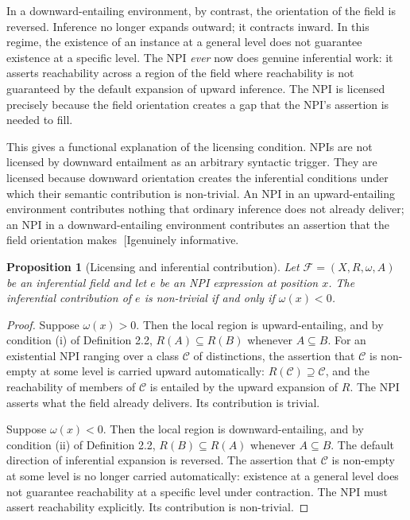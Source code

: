 \documentclass[12pt]{article}
\newtheorem{proposition}[theorem]{Proposition}
\theoremstyle{remark}
\begin{document}
In a downward-entailing environment, by contrast, the orientation of
the field is reversed. Inference no longer expands outward; it contracts
inward. In this regime, the existence of an instance at a general level
does not guarantee existence at a specific level. The NPI \emph{ever}
now does genuine inferential work: it asserts reachability across a
region of the field where reachability is not guaranteed by the default
expansion of upward inference. The NPI is licensed precisely because the
field orientation creates a gap that the NPI's assertion is needed to
fill.

This gives a functional explanation of the licensing condition. NPIs are
not licensed by downward entailment as an arbitrary syntactic trigger.
They are licensed because downward orientation creates the inferential
conditions under which their semantic contribution is non-trivial. An
NPI in an upward-entailing environment contributes nothing that ordinary
inference does not already deliver; an NPI in a downward-entailing
environment contributes an assertion that the field orientation makes
[Igenuinely informative.

\begin{proposition}[Licensing and inferential contribution]
\label{prop:npi-contrib}
Let $\mathcal{F} = (X, R, \omega, A)$ be an inferential field and let
$e$ be an NPI expression at position $x$. The inferential contribution
of $e$ is non-trivial if and only if $\omega(x) < 0$.
\end{proposition}

\begin{proof}
Suppose $\omega(x) > 0$. Then the local region is upward-entailing, and
by condition (i) of Definition 2.2, $R(A) \subseteq R(B)$ whenever $A
\subseteq B$. For an existential NPI ranging over a class $\mathcal{C}$
of distinctions, the assertion that $\mathcal{C}$ is non-empty at some
level is carried upward automatically: $R(\mathcal{C}) \supseteq
\mathcal{C}$, and the reachability of members of $\mathcal{C}$ is
entailed by the upward expansion of $R$. The NPI asserts what the field
already delivers. Its contribution is trivial.

Suppose $\omega(x) < 0$. Then the local region is downward-entailing,
and by condition (ii) of Definition 2.2, $R(B) \subseteq R(A)$ whenever
$A \subseteq B$. The default direction of inferential expansion is
reversed. The assertion that $\mathcal{C}$ is non-empty at some level
is no longer carried automatically: existence at a general level does
not guarantee reachability at a specific level under contraction.
The NPI must assert reachability explicitly. Its contribution is
non-trivial.
\end{proof}
\end{document}
